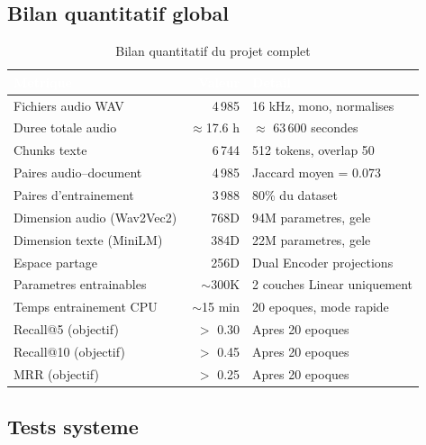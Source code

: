 \documentclass[12pt, a4paper]{article}
\begin{document}
\subsection{Bilan quantitatif global}

\begin{table}[H]
\centering
\caption{Bilan quantitatif du projet complet}
\begin{tabular}{lrl}
\toprule
\rowcolor{navy}
\textcolor{white}{\textbf{Metrique}} &
\textcolor{white}{\textbf{Valeur}} &
\textcolor{white}{\textbf{Detail}} \\
\midrule
Fichiers audio WAV       & 4\,985   & 16 kHz, mono, normalises \\
\rowcolor{silver}
Duree totale audio       & $\approx$17.6 h & $\approx$ 63\,600 secondes \\
Chunks texte             & 6\,744   & 512 tokens, overlap 50 \\
\rowcolor{silver}
Paires audio--document   & 4\,985   & Jaccard moyen = 0.073 \\
Paires d'entrainement    & 3\,988   & 80\% du dataset \\
\rowcolor{silver}
Dimension audio (Wav2Vec2) & 768D   & 94M parametres, gele \\
Dimension texte (MiniLM)   & 384D   & 22M parametres, gele \\
\rowcolor{silver}
Espace partage           & 256D     & Dual Encoder projections \\
Parametres entrainables  & $\sim$300K & 2 couches Linear uniquement \\
\rowcolor{silver}
Temps entrainement CPU   & $\sim$15 min & 20 epoques, mode rapide \\
Recall@5 (objectif)      & $>$ 0.30 & Apres 20 epoques \\
\rowcolor{silver}
Recall@10 (objectif)     & $>$ 0.45 & Apres 20 epoques \\
MRR (objectif)           & $>$ 0.25 & Apres 20 epoques \\
\bottomrule
\end{tabular}
\end{table}

\subsection{Tests systeme}
\end{document}
